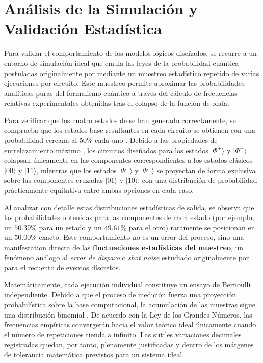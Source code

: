 \documentclass[11pt,a4paper,spanish]{book}
\begin{document}
\section{Análisis de la Simulación y Validación Estadística}

Para validar el comportamiento de los modelos lógicos diseñados, se recurre a un entorno de simulación ideal que emula las leyes de la probabilidad cuántica postuladas originalmente por \cite{born1926} mediante un muestreo estadístico repetido de varias ejecuciones por circuito. Este muestreo permite aproximar las probabilidades analíticas puras del formalismo cuántico a través del cálculo de frecuencias relativas experimentales obtenidas tras el colapso de la función de onda.

Para verificar que los cuatro estados de \cite{bell1964} se han generado correctamente, se comprueba que los estados base resultantes en cada circuito se obtienen con una probabilidad cercana al $50\%$ cada uno \citep{nielsen2010}. Debido a las propiedades de entrelazamiento máximo \citep{schrodinger1935}, los circuitos diseñados para los estados $\lvert\Phi^+\rangle$ y $\lvert\Phi^-\rangle$ colapsan únicamente en las componentes correspondientes a los estados clásicos $\lvert00\rangle$ y $\lvert11\rangle$, mientras que los estados $\lvert\Psi^+\rangle$ y $\lvert\Psi^-\rangle$ se proyectan de forma exclusiva sobre las componentes cruzadas $\lvert01\rangle$ y $\lvert10\rangle$, con una distribución de probabilidad prácticamente equitativa entre ambas opciones en cada caso.

Al analizar con detalle estas distribuciones estadísticas de salida, se observa que las probabilidades obtenidas para las componentes de cada estado (por ejemplo, un $50.39\%$ para un estado y un $49.61\%$ para el otro) raramente se posicionan en un $50.00\%$ exacto. Este comportamiento no es un error del proceso, sino una manifestation directa de las \textbf{fluctuaciones estadísticas del muestreo}, un fenómeno análogo al \emph{error de disparo} o \emph{shot noise} estudiado originalmente por \cite{schottky1918} para el recuento de eventos discretos.

Matemáticamente, cada ejecución individual constituye un ensayo de Bernoulli independiente. Debido a que el proceso de medición fuerza una proyección probabilística sobre la base computacional, la acumulación de las muestras sigue una distribución binomial \citep{nielsen2010}. De acuerdo con la Ley de los Grandes Números, las frecuencias empíricas convergerán hacia el valor teórico ideal únicamente cuando el número de repeticiones tienda a infinito. Las sutiles variaciones decimales registradas quedan, por tanto, plenamente justificadas y dentro de los márgenes de tolerancia matemática previstos para un sistema ideal.
\end{document}
